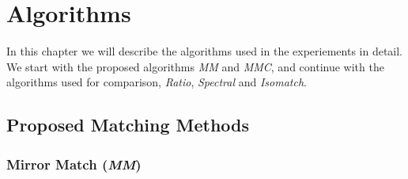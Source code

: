 \chapter{Algorithms}
\label{C:algorithms}

In this chapter we will describe the algorithms used in the experiements
in detail. We start with the proposed algorithms \emph{MM} and 
\emph{MMC}, and continue with the algorithms used for comparison, 
\emph{Ratio}, \emph{Spectral} and \emph{Isomatch}.

\section{Proposed Matching Methods}
\label{S:MatchingMethods}

\subsection{Mirror Match (\emph{MM})}

